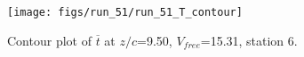 \begin{figure}[H]
\centering
\texttt{[image: figs/run\_51/run\_51\_T\_contour]}
\caption{Contour plot of $\overline{t}$ at $z/c$=9.50, $V_{free}$=15.31, station 6.}
\label{fig:run_51_T_contour}
\end{figure}


